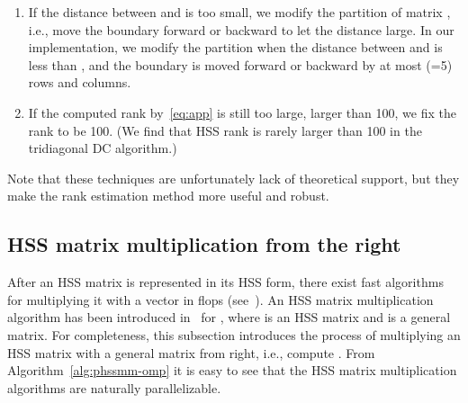 \documentclass[times]{nlaauth}
\newcounter{algorithm}
\begin{document}
\begin{enumerate}[(1)]
  \item If the distance between  and  is too small, we modify the partition of matrix , i.e., move
    the boundary forward or backward to let the distance large.
    In our implementation, we modify the partition when the distance between  and  is less than ,
    and the boundary is moved forward or backward by at most (=5) rows and columns.
   \item If the computed rank by~\eqref{eq:app} is still too large, larger than 100, we fix the rank to be 100.
     (We find that HSS rank  is rarely larger than 100 in the tridiagonal DC algorithm.)
\end{enumerate}

Note that these techniques are unfortunately lack of theoretical support, but
they make the rank estimation method more useful and robust.

\subsection{HSS matrix multiplication from the right}

After an HSS matrix is represented in its HSS form, there exist fast
algorithms for multiplying it with a vector in  flops
(see~\cite{ChandrasekaranDe06,Lyons-thesis}).
An HSS matrix multiplication algorithm has been introduced in~\cite{Lyons-thesis} for , where  is an HSS matrix and  is a general matrix.
For completeness, this subsection introduces the process of multiplying an HSS matrix with a general matrix
from right, i.e., compute . From Algorithm~\ref{alg:phssmm-omp} it is easy to see that the HSS matrix multiplication algorithms
are naturally parallelizable.
\end{document}
